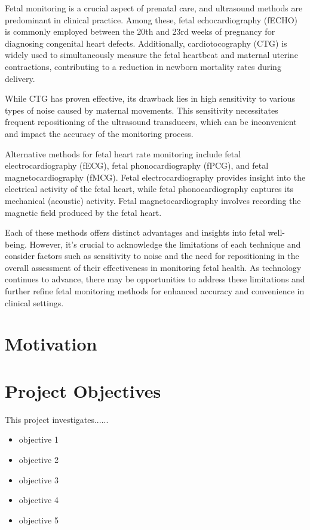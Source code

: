 \documentclass[12pt,a4paper,oneside]{report}
\begin{document}
	Fetal monitoring is a crucial aspect of prenatal care, and ultrasound methods are predominant in clinical practice. Among these, fetal echocardiography (fECHO) is commonly employed between the 20th and 23rd weeks of pregnancy for diagnosing congenital heart defects. Additionally, cardiotocography (CTG) is widely used to simultaneously measure the fetal heartbeat and maternal uterine contractions, contributing to a reduction in newborn mortality rates during delivery.
	
	While CTG has proven effective, its drawback lies in high sensitivity to various types of noise caused by maternal movements. This sensitivity necessitates frequent repositioning of the ultrasound transducers, which can be inconvenient and impact the accuracy of the monitoring process.
	
	Alternative methods for fetal heart rate monitoring include fetal electrocardiography (fECG), fetal phonocardiography (fPCG), and fetal magnetocardiography (fMCG). Fetal electrocardiography provides insight into the electrical activity of the fetal heart, while fetal phonocardiography captures its mechanical (acoustic) activity. Fetal magnetocardiography involves recording the magnetic field produced by the fetal heart.
	
	Each of these methods offers distinct advantages and insights into fetal well-being. However, it's crucial to acknowledge the limitations of each technique and consider factors such as sensitivity to noise and the need for repositioning in the overall assessment of their effectiveness in monitoring fetal health. As technology continues to advance, there may be opportunities to address these limitations and further refine fetal monitoring methods for enhanced accuracy and convenience in clinical settings.\cite{b2}
	
	
	
	\section{Motivation}
	\lipsum[2-4]
	
	
	\section{Project Objectives}
	This project investigates......
	\begin{itemize}
		\item objective 1
		\item objective 2
		\item objective 3
		\item objective 4
		\item  objective 5
		
	\end{itemize}
	
\end{document}
